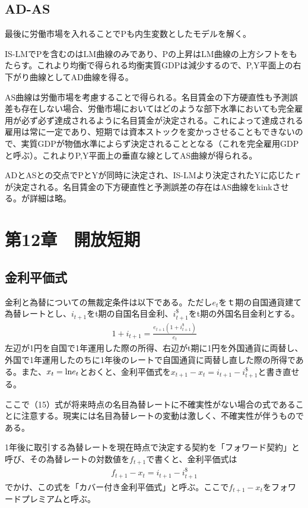 \documentclass{jsarticle}
\begin{document}
\subsection{AD-AS}
最後に労働市場を入れることでPも内生変数としたモデルを解く。

IS-LMでPを含むのはLM曲線のみであり、Pの上昇はLM曲線の上方シフトをもたらす。これより均衡で得られる均衡実質GDPは減少するので、P,Y平面上の右下がり曲線としてAD曲線を得る。

AS曲線は労働市場を考慮することで得られる。名目賃金の下方硬直性も予測誤差も存在しない場合、労働市場においてはどのような部下水準においても完全雇用が必ず必ず達成されるように名目賃金が決定される。これによって達成される雇用は常に一定であり、短期では資本ストックを変かっさせることもできないので、実質GDPが物価水準によらず決定されることとなる（これを完全雇用GDPと呼ぶ）。これよりP,Y平面上の垂直な線としてAS曲線が得られる。

ADとASとの交点でPとYが同時に決定され、IS-LMより決定されたYに応じたｒが決定される。名目賃金の下方硬直性と予測誤差の存在はAS曲線をkinkさせる。が詳細は略。

\section{第12章　開放短期}
\subsection{金利平価式}
金利と為替についての無裁定条件は以下である。ただし$e_t$をｔ期の自国通貨建て為替レートとし、$i_{t+1}$をt期の自国名目金利、$i_{t+1}^{\$}$をt期の外国名目金利とする。
\begin{align}
	1 + i_{t+1} = \frac{e_{t+1}(1 + i_{t+1}^{\$})}{e_t}
\end{align}
左辺が1円を自国で1年運用した際の所得、右辺がt期に1円を外国通貨に両替し、外国で1年運用したのちに1年後のレートで自国通貨に両替し直した際の所得である。また、$x_t = {\rm ln} e_t$とおくと、金利平価式を$x_{t+1} - x_t = i_{t+1} - i_{t+1}^{\$}$と書き直せる。

ここで（15）式が将来時点の名目為替レートに不確実性がない場合の式であることに注意する。現実には名目為替レートの変動は激しく、不確実性が伴うものである。

1年後に取引する為替レートを現在時点で決定する契約を「フォワード契約」と呼び、その為替レートの対数値を$f_{t+1}$で書くと、金利平価式は
\begin{align*}
	f_{t + 1} - x_t = i_{t+1} - i_{t+1}^{\$}
\end{align*}
でかけ、この式を「カバー付き金利平価式」と呼ぶ。ここで$f_{t + 1} - x_t$をフォワードプレミアムと呼ぶ。
\end{document}
